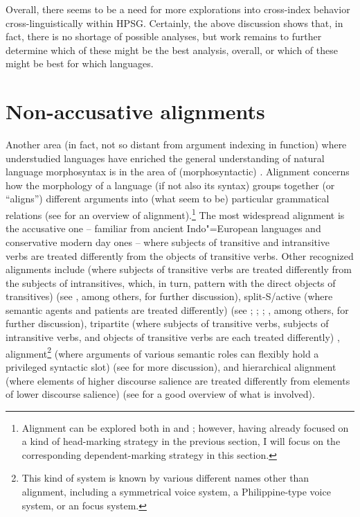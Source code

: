 \documentclass[output=paper,biblatex,babelshorthands,newtxmath,draftmode,colorlinks,citecolor=brown]{langscibook}
\begin{document}
Overall, there seems to be a need for more explorations into cross-index behavior cross-linguistically within HPSG. Certainly, the above discussion shows that, in fact, there is no shortage of possible analyses, but work remains to further determine which of these might be the best analysis, overall, or which of these might be best for which languages.

\section{Non-accusative alignments}
\label{ul:sec-non-accusative-alignments}

\largerpage 
Another area (in fact, not so distant from argument indexing in function) where
understudied languages have enriched the general understanding of natural language morphosyntax is
in the area of (morphosyntactic) . Alignment concerns how the morphology of a
language (if not also its syntax) groups together (or ``aligns'') different arguments into (what
seem to be) particular grammatical relations (see \citealt{bicknich09} for an overview of
alignment).\footnote{Alignment can be explored both in  and
   \citep{Nichols86a-u}; however, having already focused on a kind of
  head-marking strategy in the previous section, I will focus on the corresponding dependent-marking
  strategy in this section.} The most widespread alignment is the accusative one -- familiar from
ancient Indo"=European languages and conservative modern day ones -- where subjects of transitive
and intransitive verbs are treated differently from the objects of transitive verbs. Other
recognized alignments include  (where subjects of transitive verbs are treated
differently from the subjects of intransitives, which, in turn, pattern with the direct objects of
transitives) (see \citealt{comrie78erg,plank79,dixon79,dixon94}, among others, for further
discussion), split-S/active (where semantic agents and patients are treated differently) (see
\citealt{klimov73,klimov74}; \citealt[Chapter~4]{dixon94}; \citealt{mithun91}; \citealt{wichdon08},
among others, for further discussion), tripartite (where subjects of transitive verbs, subjects of
intransitive verbs, and objects of transitive verbs are each treated differently)
\citep[39--40]{dixon94},  alignment\footnote{This kind of system is known by
  various different names other than  alignment, including a symmetrical voice
  system, a Philippine-type voice system, or an  focus system.} (where arguments
of various semantic roles can flexibly hold a privileged syntactic slot) (see
\citealt{schachter76,ross02,himmelmann05typchar} for more discussion), and hierarchical alignment
(where elements of higher discourse salience are treated differently from elements of lower
discourse salience) (see \citealt{jacqant14} for a good overview of what is involved).
\end{document}
